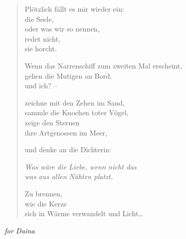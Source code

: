 \begin{verse}
Plötzlich fällt es mir wieder ein:\\
die Seele,\\
oder was wir so nennen,\\
redet nicht,\\
sie horcht.

Wenn das Narrenschiff zum zweiten Mal erscheint,\\
gehen die Mutigen an Bord.\\
und ich? --

zeichne mit den Zehen im Sand,\\
sammle die Knochen toter Vögel,\\
zeige den Sternen\\
ihre Artgenossen im Meer,

und denke an die Dichterin:

{\itshape Was wäre die Liebe, wenn nicht das\\
was aus allen Nähten platzt.}

Zu brennen,\\
wie die Kerze\\
sich in Wärme verwandelt und Licht\ldots

\end{verse}

\cleartorecto


\hspace*{2em}\emph{for Daina}

